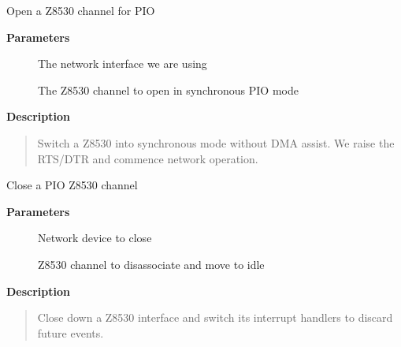 \documentclass[a4paper,8pt,english]{sphinxmanual}
\begin{document}
\begin{fulllineitems}
\label{networking/z8530book:c.z8530_sync_open}
Open a Z8530 channel for PIO

\end{fulllineitems}


\textbf{Parameters}
\begin{description}
\item[{}] \leavevmode
The network interface we are using

\item[{}] \leavevmode
The Z8530 channel to open in synchronous PIO mode

\end{description}

\textbf{Description}
\begin{quote}

Switch a Z8530 into synchronous mode without DMA assist. We
raise the RTS/DTR and commence network operation.
\end{quote}

\begin{fulllineitems}
\label{networking/z8530book:c.z8530_sync_close}
Close a PIO Z8530 channel

\end{fulllineitems}


\textbf{Parameters}
\begin{description}
\item[{}] \leavevmode
Network device to close

\item[{}] \leavevmode
Z8530 channel to disassociate and move to idle

\end{description}

\textbf{Description}
\begin{quote}

Close down a Z8530 interface and switch its interrupt handlers
to discard future events.
\end{quote}
\end{document}
